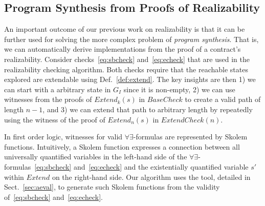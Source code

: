 \subsection{Program Synthesis from Proofs of Realizability}

An important outcome of our previous work on realizability is that it
can be further used for solving the more complex problem of
\emph{program synthesis}. That is, we can automatically
derive implementations from the proof of a contract's realizability.
Consider checks~\eqref{eq:sbcheck}
and~\eqref{eq:echeck} that are used in the realizability checking
algorithm. Both checks require that the reachable states explored are
extendable using Def.~\ref{def:extend}. The key insights are then 1)
we can start with a arbitrary state in $G_I$ since it is non-empty, 2)
we can use witnesses from the proofs of $\mathit{Extend}_k(s)$ in
$\mathit{BaseCheck}$ to create a valid path of length $n-1$, and 3) we
can extend that path to arbitrary length by repeatedly using the
witness of the proof of $\mathit{Extend}_n(s)$ in
$\mathit{ExtendCheck}(n)$.

In first order logic, witnesses for valid $\forall\exists$-formulas
are represented by Skolem functions. Intuitively, a Skolem function
expresses a connection between all universally quantified variables in
the left-hand side of the $\forall\exists$-formulas~\eqref{eq:sbcheck}
and~\eqref{eq:echeck} and the existentially quantified variable $s'$
within $\mathit{Extend}$ on the right-hand side. Our algorithm uses
the \aeval tool, detailed in Sect.~\ref{sec:aeval}, to generate such
Skolem functions from the validity of~\eqref{eq:sbcheck}
and~\eqref{eq:echeck}.



